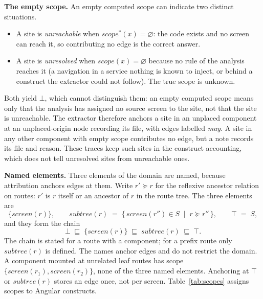 \textbf{The empty scope.} An empty computed scope can indicate two distinct situations.
\begin{itemize}
\item A site is \emph{unreachable} when $\mathit{scope}^{*}(x) = \varnothing$: the code exists
and no screen can reach it, so contributing no edge is the correct answer.
\item A site is \emph{unresolved} when $\mathit{scope}(x) = \varnothing$ because no rule of the
analysis reaches it (a navigation in a service nothing is known to inject, or behind a construct
the extractor could not follow). The true scope is unknown.
\end{itemize}
Both yield $\bot$, which cannot distinguish them: an empty computed scope means only that the
analysis has assigned no source screen to the site, not that the site is unreachable. The extractor
therefore anchors a site in an unplaced component at an unplaced-origin node recording its file, with
edges labelled \emph{may}. A site in any other component with empty scope contributes no edge, but
a note records its file and reason. These traces keep such sites in the construct accounting,
which does not tell unresolved sites from unreachable ones.

\textbf{Named elements.} Three elements of the domain are named, because attribution anchors
edges at them. Write $r' \succeq r$ for the reflexive ancestor relation on routes: $r'$ is $r$
itself or an ancestor of $r$ in the route tree. The three elements are
\[
  \{\mathit{screen}(r)\}, \qquad
  \mathit{subtree}(r) \;=\; \{\, \mathit{screen}(r'') \in S \;\mid\; r \succeq r'' \,\},
  \qquad \top \;=\; S ,
\]
and they form the chain
\[
  \bot \;\sqsubseteq\; \{\mathit{screen}(r)\} \;\sqsubseteq\; \mathit{subtree}(r)
  \;\sqsubseteq\; \top .
\]
The chain is stated for a route with a component; for a prefix route only $\mathit{subtree}(r)$ is defined.
The names anchor edges and do not restrict the domain. A component mounted at unrelated
leaf routes has scope $\{\mathit{screen}(r_1), \mathit{screen}(r_2)\}$, none of the three
named elements. Anchoring at $\top$ or $\mathit{subtree}(r)$ stores an edge once, not per screen. Table~\ref{tab:scopes} assigns scopes to Angular constructs.

